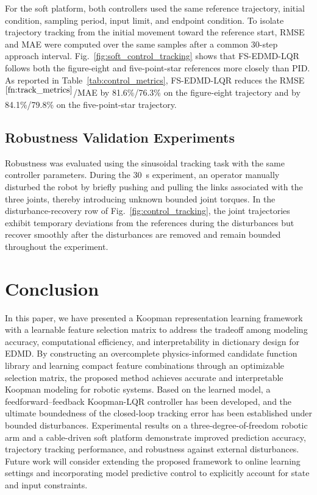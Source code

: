 For the soft platform, both controllers used the same reference trajectory,
initial condition, sampling period, input limit, and endpoint condition.
To isolate trajectory tracking from the initial movement toward the reference
start, RMSE and MAE were computed over the same samples after a common
30-step approach interval. Fig.~\ref{fig:soft_control_tracking} shows that
FS-EDMD-LQR follows both the figure-eight and five-point-star references more
closely than PID. As reported in Table~\ref{tab:control_metrics},
FS-EDMD-LQR reduces the RMSE$^{\ref{fn:track_metrics}}$/MAE by
81.6\%/76.3\% on the figure-eight trajectory and by 84.1\%/79.8\% on the
five-point-star trajectory.

\subsection{Robustness Validation Experiments}
\label{subsec:robustness_test}

Robustness was evaluated using the sinusoidal tracking task with the same controller parameters. During the 30~s experiment, an operator manually disturbed the robot by briefly pushing and pulling the links associated with the three joints, thereby introducing unknown bounded joint torques. In the disturbance-recovery row of Fig.~\ref{fig:control_tracking}, the joint trajectories exhibit temporary deviations from the references during the disturbances but recover smoothly after the disturbances are removed and remain bounded throughout the experiment.





\section{Conclusion}
\label{sec:conclusion}

In this paper, we have presented a Koopman representation learning framework with a learnable feature selection matrix to address the tradeoff among modeling accuracy, computational efficiency, and interpretability in dictionary design for EDMD. By constructing an overcomplete physics-informed candidate function library and learning compact feature combinations through an optimizable selection matrix, the proposed method achieves accurate and interpretable Koopman modeling for robotic systems. Based on the learned model, a feedforward--feedback Koopman-LQR controller has been developed, and the ultimate boundedness of the closed-loop tracking error has been established under bounded disturbances. Experimental results on a three-degree-of-freedom robotic arm and a cable-driven soft platform demonstrate improved prediction accuracy, trajectory tracking performance, and robustness against external disturbances. Future work will consider extending the proposed framework to online learning settings and incorporating model predictive control to explicitly account for state and input constraints.




